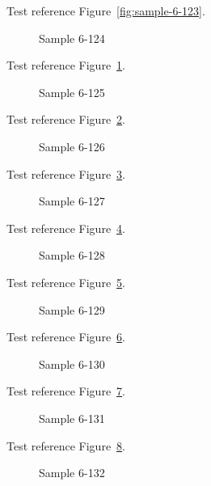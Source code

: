 Test reference Figure~\ref{fig:sample-6-123}.

\begin{figure}[tbhp]
\caption{Sample 6-124}
\label{fig:sample-6-124}
\end{figure}

Test reference Figure~\ref{fig:sample-6-124}.

\begin{figure}[tbhp]
\caption{Sample 6-125}
\label{fig:sample-6-125}
\end{figure}

Test reference Figure~\ref{fig:sample-6-125}.

\begin{figure}[tbhp]
\caption{Sample 6-126}
\label{fig:sample-6-126}
\end{figure}

Test reference Figure~\ref{fig:sample-6-126}.

\begin{figure}[tbhp]
\caption{Sample 6-127}
\label{fig:sample-6-127}
\end{figure}

Test reference Figure~\ref{fig:sample-6-127}.

\begin{figure}[tbhp]
\caption{Sample 6-128}
\label{fig:sample-6-128}
\end{figure}

Test reference Figure~\ref{fig:sample-6-128}.

\begin{figure}[tbhp]
\caption{Sample 6-129}
\label{fig:sample-6-129}
\end{figure}

Test reference Figure~\ref{fig:sample-6-129}.

\begin{figure}[tbhp]
\caption{Sample 6-130}
\label{fig:sample-6-130}
\end{figure}

Test reference Figure~\ref{fig:sample-6-130}.

\begin{figure}[tbhp]
\caption{Sample 6-131}
\label{fig:sample-6-131}
\end{figure}

Test reference Figure~\ref{fig:sample-6-131}.

\begin{figure}[tbhp]
\caption{Sample 6-132}
\label{fig:sample-6-132}
\end{figure}

